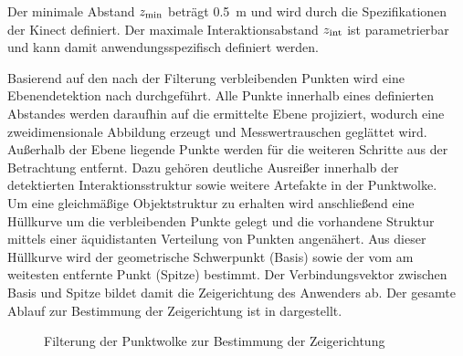 \prever{
}
Der minimale Abstand $z_{\mathrm{{min}}}$ beträgt \SI{0,5}{\meter} und wird durch die Spezifikationen der Kinect definiert. Der maximale Interaktionsabstand $z_{\mathrm{{int}}}$ ist parametrierbar und kann damit anwendungsspezifisch definiert werden.\\



Basierend auf den nach der Filterung verbleibenden Punkten wird eine Ebenendetektion nach \cite{Fischler1981} durchgeführt. Alle Punkte innerhalb eines definierten Abstandes werden daraufhin auf die ermittelte Ebene projiziert, wodurch eine zweidimensionale Abbildung erzeugt und Messwertrauschen geglättet wird. Außerhalb der Ebene liegende Punkte werden für die weiteren Schritte aus der Betrachtung entfernt. Dazu gehören deutliche Ausreißer innerhalb der detektierten Interaktionsstruktur sowie weitere Artefakte in der Punktwolke.\\

Um eine gleichmäßige Objektstruktur zu erhalten wird anschließend eine Hüllkurve um die verbleibenden Punkte gelegt und die vorhandene Struktur mittels einer äquidistanten Verteilung von Punkten angenähert. Aus dieser Hüllkurve wird der geometrische Schwerpunkt (Basis) sowie der vom \kps{} am weitesten entfernte Punkt (Spitze) bestimmt. Der Verbindungsvektor zwischen Basis und Spitze bildet damit die Zeigerichtung des Anwenders ab. Der gesamte Ablauf zur Bestimmung der Zeigerichtung ist in  dargestellt.\\

\begin{figure}[!ht]
	\begin{center}
	\hspace{5mm}
	\hspace{5mm}
	\caption{Filterung der Punktwolke zur Bestimmung der Zeigerichtung}
	\label{fig.intdir}
	\end{center}
\end{figure}

